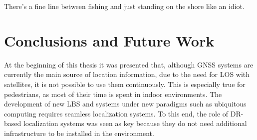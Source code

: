 



\begin{savequote}[50mm]
There’s a fine line between fishing and just standing on the shore like an idiot.
\end{savequote}

\chapter{Conclusions and Future Work}
\label{cha:10_conclusions}

\ifpdf
    \graphicspath{{10_conclusions/figures/PNG/}{10_conclusions/figures/PDF/}{10_conclusions/figures/}}
\else
    \graphicspath{{10_conclusions/figures/EPS/}{10_conclusions/figures/}}
\fi


At the beginning of this thesis it was presented that, although GNSS systems are currently the main source of location information, due to the need for LOS with satellites, it is not possible to use them continuously.
This is especially true for pedestrians, as most of their time is spent in indoor environments.
The development of new LBS and systems under new paradigms such as ubiquitous computing requires seamless localization systems.
To this end, the role of DR-based localization systems was seen as key because they do not need additional infrastructure to be installed in the environment.


